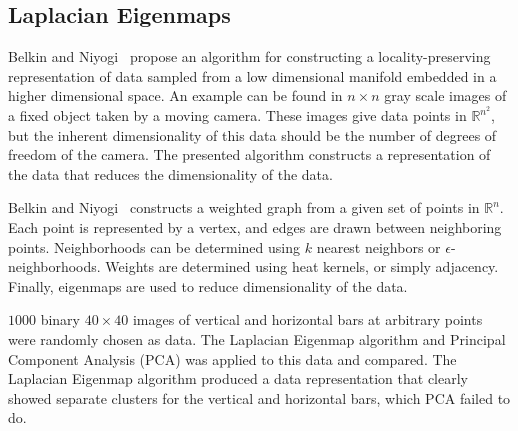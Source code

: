 \subsection{Laplacian Eigenmaps}
Belkin and Niyogi~\cite{belkin2002laplacian} propose an algorithm for constructing a locality-preserving representation of data sampled from a low dimensional manifold embedded in a higher dimensional space. An example can be found in $n\times n$ gray scale images of a fixed object taken by a moving camera. These images give data points in $\mathbb{R}^{n^{2}}$, but the inherent dimensionality of this data should be the number of degrees of freedom of the camera. The presented algorithm constructs a representation of the data that reduces the dimensionality of the data.

Belkin and Niyogi~\cite{belkin2002laplacian} constructs a weighted graph from a given set of points in $\mathbb{R}^{n}$. Each point is represented by a vertex, and edges are drawn between neighboring points. Neighborhoods can be determined using $k$ nearest neighbors or $\epsilon$-neighborhoods. Weights are determined using heat kernels, or simply adjacency. Finally, eigenmaps are used to reduce dimensionality of the data.

$1000$ binary $40 \times 40$ images of vertical and horizontal bars at arbitrary points were randomly chosen as data. The Laplacian Eigenmap algorithm and Principal Component Analysis (PCA) was applied to this data and compared. The Laplacian Eigenmap algorithm produced a data representation that clearly showed separate clusters for the vertical and horizontal bars, which PCA failed to do.
